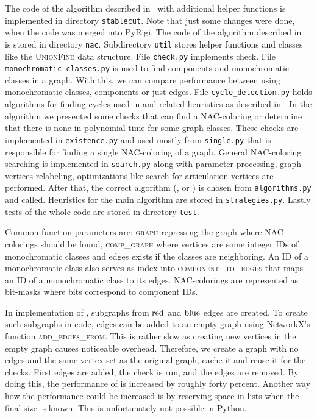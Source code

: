 The code of the algorithm described in~
with additional helper functions is implemented in directory \texttt{stablecut}.
Note that just some changes were done, when the code was merged into PyRigi.
The code of the algorithm described in~
is stored in directory \texttt{nac}.
Subdirectory \texttt{util} stores helper functions and classes like the \textsc{UnionFind} data structure.
File \texttt{check.py} implements \IsNACColoring{} check.
File \texttt{monochromatic\_classes.py} is used to find \trcon{} components
and monochromatic classes in a graph. With this, we can compare performance
between using monochromatic classes, \trcon{} components or just edges.
File \texttt{cycle\_detection.py} holds algorithms for finding cycles
used in 
and related heuristics as described in .
In the algorithm we presented some checks that can find
a NAC-coloring or determine that there is none in polynomial time for some graph classes.
These checks are implemented in \texttt{existence.py} and
used mostly from \texttt{single.py} that is responsible for finding a single NAC-coloring of a graph.
General NAC-coloring searching is implemented in \texttt{search.py}
along with parameter processing, graph vertices relabeling,
optimizations like search for articulation vertices are performed.
After that, the correct algorithm (\Naive{}, \NaiveCycles{} or )
is chosen from \texttt{algorithms.py} and called.
Heuristics for the main algorithm are stored in \texttt{strategies.py}.
Lastly tests of the whole code are stored in directory \texttt{test}.

Common function parameters are:
\textsc{graph} repressing the graph where NAC-colorings should be found,
\textsc{comp\_graph} where vertices are some integer IDs of monochromatic classes
and edges exists if the classes are neighboring.
An ID of a monochromatic class also serves as index into \textsc{component\_to\_edges}
that maps an ID of a monochromatic class to its edges.
NAC-colorings are represented as bit-masks where bits correspond to component IDs.

In implementation of \IsNACColoring{}, subgraphs from \( \text{red} \) and \( \text{blue} \) edges are created.
To create such subgraphs in code, edges can be added to an empty graph
using NetworkX's function \textsc{add\_edges\_from}.
This is rather slow as creating new vertices in the empty graph causes noticeable overhead.
Therefore, we create a graph with no edges and the same vertex set as the original graph,
cache it and reuse it for the checks. First edges are added, the check is run, and the edges are removed.
By doing this, the performance of \IsNACColoring{} is increased by roughly forty percent.
Another way how the performance could be increased is by reserving space in lists
when the final size is known. This is unfortunately not possible in Python.


